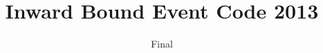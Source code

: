 \makeatletter
\def\thickhrulefill{\leavevmode \leaders \hrule height 1pt\hfill \kern \z@}
\renewcommand{\maketitle}{\begin{titlepage}%
    \let\footnotesize\small
    \let\footnoterule\relax
    \parindent \z@
    \reset@font
    \null
    \vskip 10\p@
    \hbox{\mbox{\hspace{3em}}%
      \vrule depth 0.6\textheight%
      \mbox{\hspace{2em}}
      \vbox{
        \vskip 20\p@
        \begin{flushleft}
          \Large \@author \par
        \end{flushleft}
        \vskip 80\p@
        \begin{flushleft}
          \huge \bfseries \@title \par
        \end{flushleft}
        \vfil
        }}
    \null
  \end{titlepage}%
  \setcounter{footnote}{0}%
}
\makeatother
                \title{Inward Bound Event Code 2013}
                \author{Final}

\newcommand{\defi}[1]{\nop{#1}{\textbf{\emph{#1}}}\index{#1}}

\renewcommand\labelenumi{(\arabic{enumi})}
\renewcommand\labelenumiii{(\roman{enumiii})}
\renewcommand\labelenumiv{(\Alph{enumiv})}
    \makeatletter
    \renewcommand{\p@enumii}{\theenumi)(}
    \makeatother

\newcommand\approach{\hyplink{approach}}
\newcommand\amended{%
}


\newcommand{\Captain}{\hyplink{Coach}}
\newcommand{\chiefjudge}{\hyplink{chief judge}}
\newcommand{\Coach}{\hyplink{Coach}}\newcommand{\xCaptain}{Coach}
\newcommand{\competitor}{\hyplink{competitor}}
\newcommand{\course}{\hyplink{course}}
\newcommand{\CourseSetter}{\hyplink{course setter}}
\newcommand{\coursearea}{\hyplink{course area}}

\newcommand\dropoffpoint{drop-off point}

\newcommand{\eg}[1]{{\small
\begin{tabular}
  {p{0.3cm}p{11.75cm}}
  \emph{e.g.}&#1
\end{tabular}
}}
\newcommand\Endpoint{end point}
\newcommand\Event{event}
\newcommand\exresident{\hyplink{ex-resident}}
\newcommand\exemptitem{\hyplink{exempt item}}

